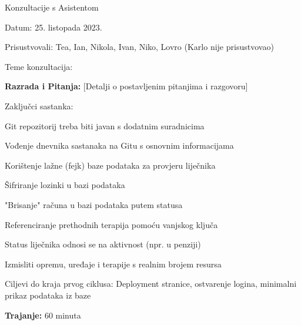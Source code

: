 \begin{packed_enum}
        \item Konzultacije s Asistentom
        \item[] \begin{packed_item}
            \item Datum: 25. listopada 2023.
            \item Prisustvovali: Tea, Ian, Nikola, Ivan, Niko, Lovro (Karlo nije prisustvovao)
            \item Teme konzultacija:
                \begin{packed_item}
                    \item \textbf{Razrada i Pitanja:} [Detalji o postavljenim pitanjima i razgovoru]
                \end{packed_item}
            \item Zaključci sastanka:
                \begin{packed_item}
                    \item Git repozitorij treba biti javan s dodatnim suradnicima
                    \item Vođenje dnevnika sastanaka na Gitu s osnovnim informacijama
                    \item Korištenje lažne (fejk) baze podataka za provjeru liječnika
                    \item Šifriranje lozinki u bazi podataka
                    \item "Brisanje" računa u bazi podataka putem statusa
                    \item Referenciranje prethodnih terapija pomoću vanjskog ključa
                    \item Status liječnika odnosi se na aktivnost (npr. u penziji)
                    \item Izmisliti opremu, uređaje i terapije s realnim brojem resursa
                    \item Ciljevi do kraja prvog ciklusa: Deployment stranice, ostvarenje logina, minimalni prikaz podataka iz baze
                \end{packed_item}
            \item \textbf{Trajanje:} 60 minuta
        \end{packed_item}
\vspace{30pt}
        

\end{packed_enum}
